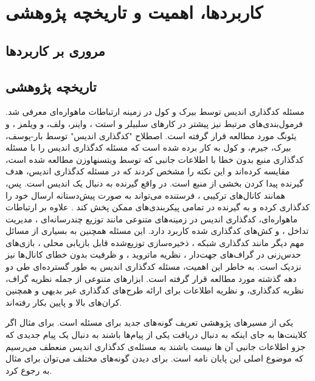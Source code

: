 \section{
	کاربردها، اهمیت و تاریخچه پژوهشی
	}
\subsection{
	مروری بر کاربردها
}

\subsection{
تاریخچه پژوهشی
}
مسئله کدگذاری اندیس توسط بیرک و کول 
\cite{25, 26}
 در زمینه ارتباطات ماهواره‌ای معرفی شد. فرمول‌بندی‌های مرتبط نیز پیشتر در کارهای سلبیلر و استت
  \cite{paper:1455117:Celebiler}،
   واینر، ولف، و ویلمز 
\cite{152}
، و یئونگ 
\cite{158}
 مورد مطالعه قرار گرفته است. اصطلاح "کدگذاری اندیس" توسط بار-یوسف، بیرک، جیرم، و کول 
\cite{4031356}
 به کار برده شده است که مسئله کدگذاری اندیس را با مسئله کدگذاری منبع بدون خطا با اطلاعات جانبی که توسط ویتسنهاوزن
\cite{1055607}
 مطالعه شده است، مقایسه کرده‌اند و این نکته را مشخص کردند که در مسئله کدگذاری اندیس، هدف گیرنده پیدا کردن بخشی از منبع است. در واقع گیرنده به دنبال یک اندیس است. پس، همانند کانال‌های ترکیبی
 \cite{27, 53, 154}
، فرستنده می‌تواند به صورت پیش‌دستانه ارسال خود را کدگذاری کرده و به گیرنده در تمامی پیکربندی‌های ممکن پخش کند
\cite{48}
. علاوه بر ارتباطات ماهواره‌ای، کدگذاری اندیس در زمینه‌های متنوعی مانند توزیع چندرسانه‌ای 
\cite{114}
، مدیریت تداخل 
\cite{81}
، و  کش‌های کدگذاری شده 
\cite{103, 82}
 کاربرد دارد. این مسئله همچنین به بسیاری از مسائل مهم دیگر مانند کدگذاری شبکه 
\cite{122, 61, 59}
، ذخیره‌سازی توزیع‌شده قابل بازیابی محلی 
\cite{108, 128, 13}
، بازی‌های حدس‌زنی در گراف‌های جهت‌دار 
\cite{122, 162, 13}
، نظریه ماتروید 
\cite{61}
، و ظرفیت بدون خطای کانال‌ها 
\cite{131}
 نیز نزدیک است.
به خاطر این اهمیت، مسئله کدگذاری اندیس به طور گسترده‌ای طی دو دهه گذشته مورد مطالعه قرار گرفته است. ابزارهای متنوعی از جمله نظریه گراف، نظریه کدگذاری، و نظریه اطلاعات برای ارائه طرح‌های کدگذاری غیر بدیهی
\cite{25, 101, 22, 43, 114, 29, 8, 104, 81, 130, 7, 9, 149, 116, 80, 141, 146, 162}
و همچنین کران‌‌های بالا و پایین 
\cite{160, 22, 55, 28, 17, 141}
 بکار رفته‌اند.
 
 یکی از مسیرهای پژوهشی تعریف گونه‌های جدید برای مسئله است. برای مثال اگر کلاینت‌ها به جای اینکه به دنبال دریافت یکی از پیام‌ها باشند  به دنبال یک پیام جدیدی که جزو اطلاعات جانبی آن ها نیست باشند به مسئله‌ی کدگذاری اندیس منعطف می‌رسیم که موضوع اصلی این پایان نامه است. برای  دیدن گونه‌های مختلف می‌توان برای مثال به
 \cite{pliablefirstpaper, verypliable, byrne2023preferential}
 رجوع کرد.
 
